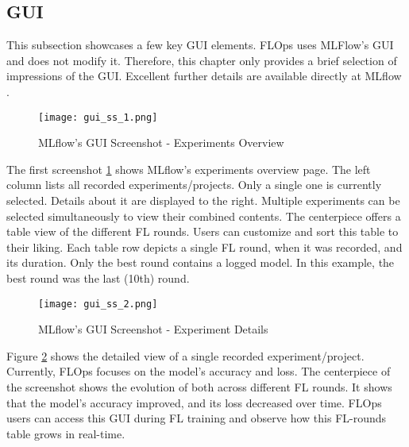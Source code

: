 \subsection{GUI}

This subsection showcases a few key GUI elements.
FLOps uses MLFlow's GUI and does not modify it.
Therefore, this chapter only provides a brief selection of impressions of the GUI.
Excellent further details are available directly at MLflow \cite{mlflow:homepage}.

\begin{figure}[p]
    \begin{adjustwidth}{-0.1\paperwidth}{-0.1\paperwidth}
        \centering
        \texttt{[image: gui\_ss\_1.png]}
        \caption{MLflow's GUI Screenshot - Experiments Overview}
        \label{fig:gui_ss_1}
    \end{adjustwidth}
\end{figure}

The first screenshot \ref{fig:gui_ss_1} shows MLflow's experiments overview page.
The left column lists all recorded experiments/projects.
Only a single one is currently selected.
Details about it are displayed to the right.
Multiple experiments can be selected simultaneously to view their combined contents.
The centerpiece offers a table view of the different FL rounds.
Users can customize and sort this table to their liking.
Each table row depicts a single FL round, when it was recorded, and its duration.
Only the best round contains a logged model.
In this example, the best round was the last (10th) round.

\begin{figure}[p]
    \begin{adjustwidth}{-0.1\paperwidth}{-0.1\paperwidth}
        \centering
        \texttt{[image: gui\_ss\_2.png]}
        \caption{MLflow's GUI Screenshot - Experiment Details}
        \label{fig:gui_ss_2}
    \end{adjustwidth}
\end{figure}

Figure \ref{fig:gui_ss_2} shows the detailed view of a single recorded experiment/project.
Currently, FLOps focuses on the model's accuracy and loss.
The centerpiece of the screenshot shows the evolution of both across different FL rounds.
It shows that the model's accuracy improved, and its loss decreased over time.
FLOps users can access this GUI during FL training and observe how this FL-rounds table grows in real-time.

